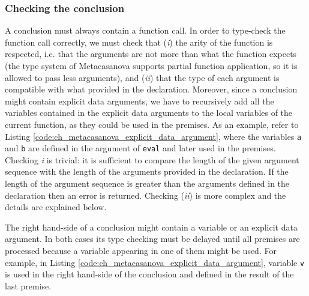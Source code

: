\subsubsection{Checking the conclusion}
A conclusion must always contain a function call. In order to type-check the function call correctly, we must check that (\textit{i}) the arity of the function is respected, i.e. that the arguments are not more than what the function expects (the type system of Metacasanova supports partial function application, so it is allowed to pass less arguments), and (\textit{ii}) that the type of each argument is compatible with what provided in the declaration. Moreover, since a conclusion might contain explicit data arguments, we have to recursively add all the variables contained in the explicit data arguments to the local variables of the current function, as they could be used in the premises. As an example, refer to Listing \ref{code:ch_metacasanova_explicit_data_argument}, where the variables \texttt{a} and \texttt{b} are defined in the argument of \texttt{eval} and later used in the premises.
Checking \textit{i} is trivial: it is sufficient to compare the length of the given argument sequence with the length of the arguments provided in the declaration. If the length of the argument sequence is greater than the arguments defined in the declaration then an error is returned. Checking (\textit{ii}) is more complex and the details are explained below.

The right hand-side of a conclusion might contain a variable or an explicit data argument. In both cases its type checking must be delayed until all premises are processed because a variable appearing in one of them might be used. For example, in Listing \ref{code:ch_metacasanova_explicit_data_argument}, variable \texttt{v} is used in the right hand-side of the conclusion and defined in the result of the last premise.

